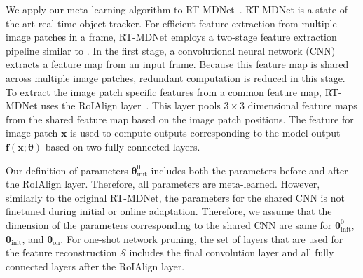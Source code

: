 \documentclass[letterpaper]{article} %
\def \x{\mathbf{x}}
\def \f{\mathbf{f}}
\def \thetainit{{\boldsymbol{\theta}_\text{init}^0}}
\def \thetainitadapt{\boldsymbol{\theta}_\text{init}}
\def \thetaonlineadapt{\boldsymbol{\theta}_\text{on}}
\begin{document}
We apply our meta-learning algorithm to RT-MDNet~\cite{jung2018realtime}. RT-MDNet is a state-of-the-art real-time object tracker.
For efficient feature extraction from multiple image patches in a frame, RT-MDNet employs a two-stage feature extraction pipeline similar to \cite{he2017maskrcnn}.
In the first stage, a convolutional neural network (CNN) extracts a feature map from an input frame.
Because this feature map is shared across multiple image patches, redundant computation is reduced in this stage.
To extract the image patch specific features from a common feature map, RT-MDNet uses the RoIAlign layer~\cite{he2017maskrcnn}.
This layer pools $3 \times 3$ dimensional feature maps from the shared feature map based on the image patch positions.
The feature for image patch $\x$ is used to compute outputs corresponding to the model output $\f(\x; \boldsymbol{\theta})$ based on two fully connected layers.

Our definition of parameters $\thetainit$ includes both the parameters before and after the RoIAlign layer.
Therefore, all parameters are meta-learned.
However, similarly to the original RT-MDNet, the parameters for the shared CNN is not finetuned during initial or online adaptation.
Therefore, we assume that the dimension of the parameters corresponding to the shared CNN are same for $\thetainit$, $\thetainitadapt$, and $\thetaonlineadapt$.
For one-shot network pruning, the set of layers that are used for the feature reconstruction $\mathcal{S}$ includes the final convolution layer and all fully connected layers after the RoIAlign layer.
\fi
\end{document}
